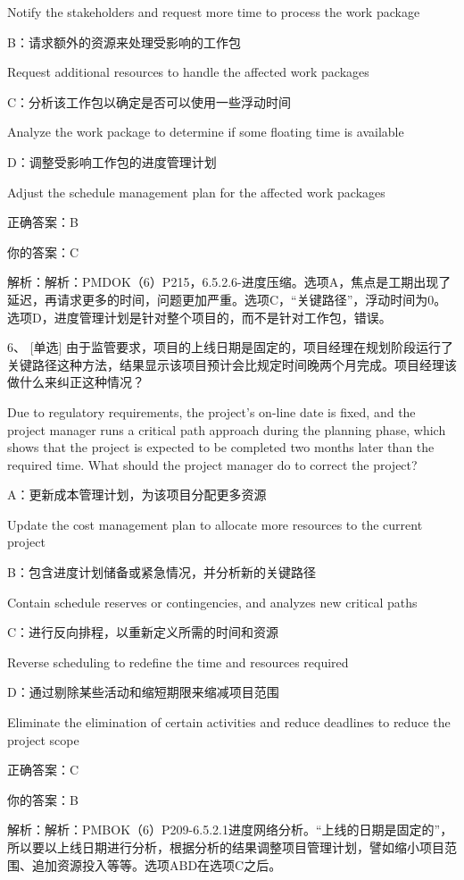 Notify the stakeholders and request more time to process the work package

B：请求额外的资源来处理受影响的工作包

Request additional resources to handle the affected work packages

C：分析该工作包以确定是否可以使用一些浮动时间

Analyze the work package to determine if some floating time is available

D：调整受影响工作包的进度管理计划

Adjust the schedule management plan for the affected work packages

正确答案：B

你的答案：C

解析：解析：PMDOK（6）P215，6.5.2.6-进度压缩。选项A，焦点是工期出现了延迟，再请求更多的时间，问题更加严重。选项C，“关键路径”，浮动时间为0。选项D，进度管理计划是针对整个项目的，而不是针对工作包，错误。


6、 [单选] 由于监管要求，项目的上线日期是固定的，项目经理在规划阶段运行了关键路径这种方法，结果显示该项目预计会比规定时间晚两个月完成。项目经理该做什么来纠正这种情况？

Due to regulatory requirements, the project's on-line date is fixed, and the project manager runs a critical path approach during the planning phase, which shows that the project is expected to be completed two months later than the required time. What should the project manager do to correct the project?

A：更新成本管理计划，为该项目分配更多资源

Update the cost management plan to allocate more resources to the current project

B：包含进度计划储备或紧急情况，并分析新的关键路径

Contain schedule reserves or contingencies, and analyzes new critical paths

C：进行反向排程，以重新定义所需的时间和资源

Reverse scheduling to redefine the time and resources required

D：通过剔除某些活动和缩短期限来缩减项目范围

Eliminate the elimination of certain activities and reduce deadlines to reduce the project scope

正确答案：C

你的答案：B

解析：解析：PMBOK（6）P209-6.5.2.1进度网络分析。“上线的日期是固定的”，所以要以上线日期进行分析，根据分析的结果调整项目管理计划，譬如缩小项目范围、追加资源投入等等。选项ABD在选项C之后。



